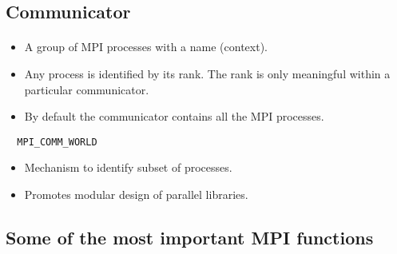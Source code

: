 \subsection*{Communicator}

\paragraph{}
\begin{itemize}
\item A group of MPI processes with a name (context).

\item Any process is identified by its rank. The rank is only meaningful within a particular communicator.

\item By default the communicator contains all the MPI processes.
\end{itemize}

\noindent


\begin{verbatim}
  MPI_COMM_WORLD 

\end{verbatim}

\begin{itemize}
\item Mechanism to identify subset of processes.

\item Promotes modular design of parallel libraries.
\end{itemize}

\noindent



\subsection*{Some of the most  important MPI functions}

\paragraph{}

